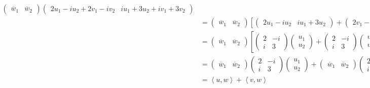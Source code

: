 \begin{questions}
\begin{solution}
\begin{itemize}
\begin{align*}
\begin{pmatrix}
\overline{w}_1&\overline{w}_2
\end{pmatrix}\begin{pmatrix}
2u_1-iu_2+2v_1-iv_2&iu_1+3u_2+iv_1+3v_2
\end{pmatrix}\\
&=\begin{pmatrix}
\overline{w}_1&\overline{w}_2
\end{pmatrix}\left[\begin{pmatrix}
2u_1-iu_2&iu_1+3u_2\end{pmatrix}+\begin{pmatrix}
2v_1-iv_2&iv_1+3v_2
\end{pmatrix}\right]\\
&=\begin{pmatrix}
\overline{w}_1&\overline{w}_2
\end{pmatrix}\left[\begin{pmatrix}
2&-i\\i&3
\end{pmatrix}\begin{pmatrix}
u_1\\u_2
\end{pmatrix}+\begin{pmatrix}
2&-i\\i&3
\end{pmatrix}\begin{pmatrix}
v_1\\v_2
\end{pmatrix}\right]\\
&=\begin{pmatrix}
\overline{w}_1&\overline{w}_2
\end{pmatrix}\begin{pmatrix}
2&-i\\i&3
\end{pmatrix}\begin{pmatrix}
u_1\\u_2
\end{pmatrix}+\begin{pmatrix}
\overline{w}_1&\overline{w}_2
\end{pmatrix}\begin{pmatrix}
2&-i\\i&3
\end{pmatrix}\begin{pmatrix}
v_1\\v_2
\end{pmatrix}\\
&=\left<u,w\right>+\left<v,w\right>
\end{align*}
\end{itemize}
\end{solution}
\end{questions}
